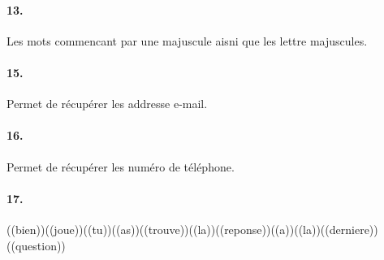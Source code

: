 \paragraph{13.}
Les mots commencant par une majuscule aisni que les lettre majuscules.

\paragraph{15.}
Permet de récupérer les addresse e-mail.

\paragraph{16.}
Permet de récupérer les numéro de téléphone.

\paragraph{17.}
((bien))((joue))((tu))((as))((trouve))((la))((reponse))((a))((la))((derniere))((question))
